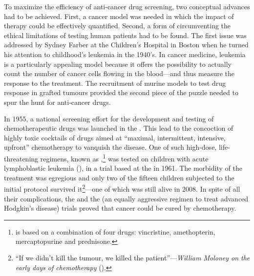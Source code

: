 To maximize the efficiency of anti-cancer drug screening, two conceptual
advances had to be achieved.  First, a cancer model was needed in which the
impact of therapy could be effectively quantified.  Second, a form of
circumventing the ethical limitations of testing human patients had to be found.
The first issue was addressed by Sydney Farber at the Children's Hospital in
Boston when he turned his attention to childhood's leukemia in the
1940's.\cite{devita_history_2008} In cancer medicine, leukemia is a particularly
appealing model because it offers the possibility to actually count the number
of cancer cells flowing in the blood---and thus measure the response to the
treatment.  The recruitment of murine models to test drug response in grafted
tumours provided the second piece of the puzzle needed to spur the hunt for
anti-cancer drugs.\cite{clowes_further_1905}

In 1955, a national screening effort for the development and testing of
chemotherapeutic drugs was launched in the .  This lead to the
concoction of highly toxic cocktails of drugs aimed at ``maximal, intermittent,
intensive, upfront'' chemotherapy to vanquish the
disease.\cite{frei_curative_1985} One of such high-dose, life-threatening
regimens, known as ,\footnote{ is based on a
  combination of four drugs: vincristine, amethopterin, mercaptopurine and
  prednisone.} was tested on children with acute lymphoblastic leukemia
(), in a trial based at the  in 1961.  The
morbidity of the treatment was egregious and only two of the fifteen children
subjected to the initial protocol survived it\footnote{``If we didn't kill the
  tumour, we killed the patient''---\emph{William Moloney on the early days of
    chemotherapy} (\citealp{moloney_pioneering_1997}).}---one of which was still
alive in 2008.\cite{mukherjee_emperor_2011} In spite of all their complications,
the \cite{frei_effectiveness_1965} and the
\cite{devita_combination_1970} (an equally aggressive regimen to
treat advanced Hodgkin's disease) trials proved that cancer could be cured by
chemotherapy.

